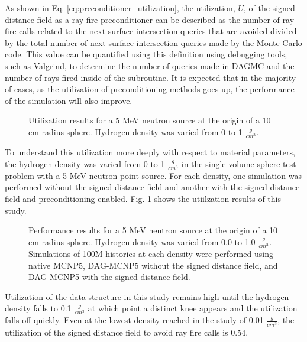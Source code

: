 As shown in Eq. \ref{eq:preconditioner_utilization}, the utilization, $U$, of
the signed distance field as a ray fire preconditioner can be described as the
number of ray fire calls related to the next surface intersection queries that
are avoided divided by the total number of next surface intersection queries
made by the Monte Carlo code. This value can be quantified using this definition
using debugging tools, such as Valgrind, to determine the number of queries made
in DAGMC and the number of rays fired inside of the subroutine.  It is expected
that in the majority of cases, as the utilization of preconditioning methods
goes up, the performance of the simulation will also improve.



\begin{figure}[ht]
  \centering
  {\textwidth}
  \caption{Utilization results for a 5 MeV neutron source at the origin of a 10 cm radius
    sphere. Hydrogen density was varied from 0 to 1 $\frac{g}{cm^3}$.}
  \label{fig:sphere_hydrogen_density_study_util}
\end{figure}

To understand this utilization more deeply with respect to material parameters,
the hydrogen density was varied from 0 to 1 $\frac{g}{cm^3}$ in the single-volume
sphere test problem with a 5 MeV neutron point source. For each density, one
simulation was performed without the signed distance field and another with the
signed distance field and preconditioning enabled. Fig.
\ref{fig:sphere_hydrogen_density_study_util} shows the utiilzation results of this study. 

\begin{figure}[ht]
  \centering
  {\textwidth}
  \caption{Performance results for a 5 MeV neutron source at the origin of a 10
    cm radius sphere. Hydrogen density was varied from 0.0 to 1.0
    $\frac{g}{cm^3}$. Simulations of 100M histories at each density were
    performed using native MCNP5, DAG-MCNP5 without the signed distance field,
    and DAG-MCNP5 with the signed distance field.}
  \label{fig:sphere_hydrogen_density_study_perf}
\end{figure}

Utilization of the data structure in this study remains high until the hydrogen
density falls to 0.1 $\frac{g}{cm^3}$ at which point a distinct knee appears and
the utilization falls off quickly. Even at the lowest density reached in the
study of 0.01 $\frac{g}{cm^3}$, the utilization of the signed distance field to
avoid ray fire calls is 0.54.


